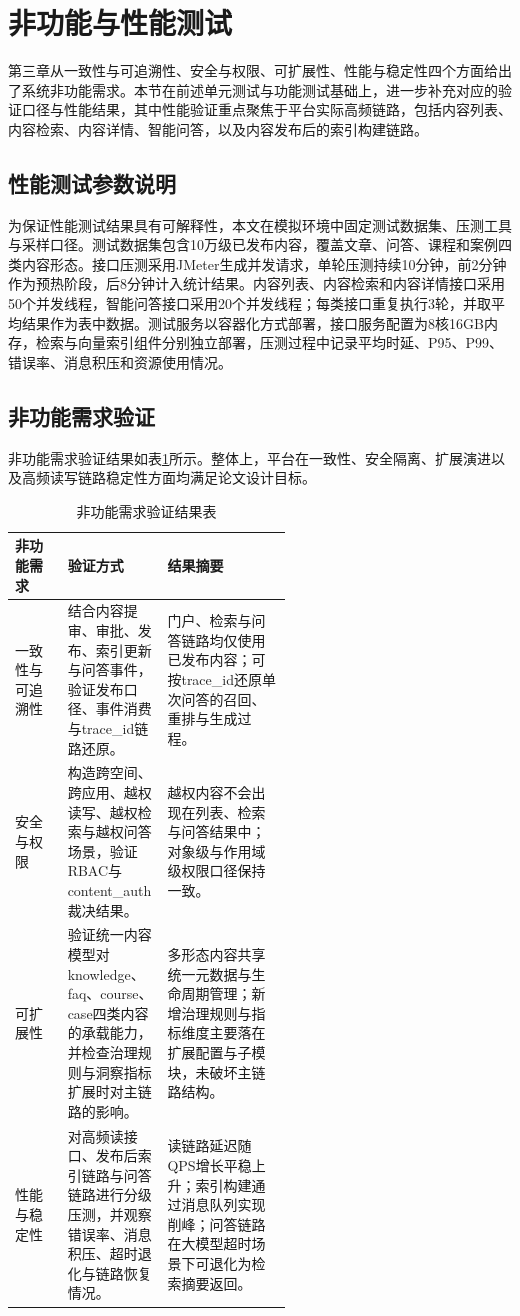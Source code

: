 \section{非功能与性能测试}

第三章从一致性与可追溯性、安全与权限、可扩展性、性能与稳定性四个方面给出了系统非功能需求。本节在前述单元测试与功能测试基础上，进一步补充对应的验证口径与性能结果，其中性能验证重点聚焦于平台实际高频链路，包括内容列表、内容检索、内容详情、智能问答，以及内容发布后的索引构建链路。

\subsection{性能测试参数说明}

为保证性能测试结果具有可解释性，本文在模拟环境中固定测试数据集、压测工具与采样口径。测试数据集包含10万级已发布内容，覆盖文章、问答、课程和案例四类内容形态。接口压测采用JMeter生成并发请求，单轮压测持续10分钟，前2分钟作为预热阶段，后8分钟计入统计结果。内容列表、内容检索和内容详情接口采用50个并发线程，智能问答接口采用20个并发线程；每类接口重复执行3轮，并取平均结果作为表中数据。测试服务以容器化方式部署，接口服务配置为8核16GB内存，检索与向量索引组件分别独立部署，压测过程中记录平均时延、P95、P99、错误率、消息积压和资源使用情况。

\subsection{非功能需求验证}

非功能需求验证结果如表\ref{tab:nfr_verify}所示。整体上，平台在一致性、安全隔离、扩展演进以及高频读写链路稳定性方面均满足论文设计目标。

\begin{table}[!htbp]
  \centering
  \caption{非功能需求验证结果表}
  \label{tab:nfr_verify}
  \small
  \begin{tabularx}{\linewidth}{>{\raggedright\arraybackslash}p{0.19\linewidth}|>{\raggedright\arraybackslash}p{0.36\linewidth}|>{\raggedright\arraybackslash}X}
    \hline
    非功能需求 & 验证方式 & 结果摘要 \\ \hline
    一致性与可追溯性 & 结合内容提审、审批、发布、索引更新与问答事件，验证发布口径、事件消费与trace\_id链路还原。 & 门户、检索与问答链路均仅使用已发布内容；可按trace\_id还原单次问答的召回、重排与生成过程。 \\ \hline
    安全与权限 & 构造跨空间、跨应用、越权读写、越权检索与越权问答场景，验证RBAC与content\_auth裁决结果。 & 越权内容不会出现在列表、检索与问答结果中；对象级与作用域级权限口径保持一致。 \\ \hline
    可扩展性 & 验证统一内容模型对knowledge、faq、course、case四类内容的承载能力，并检查治理规则与洞察指标扩展时对主链路的影响。 & 多形态内容共享统一元数据与生命周期管理；新增治理规则与指标维度主要落在扩展配置与子模块，未破坏主链路结构。 \\ \hline
    性能与稳定性 & 对高频读接口、发布后索引链路与问答链路进行分级压测，并观察错误率、消息积压、超时退化与链路恢复情况。 & 读链路延迟随QPS增长平稳上升；索引构建通过消息队列实现削峰；问答链路在大模型超时场景下可退化为检索摘要返回。 \\ \hline
  \end{tabularx}
\end{table}

